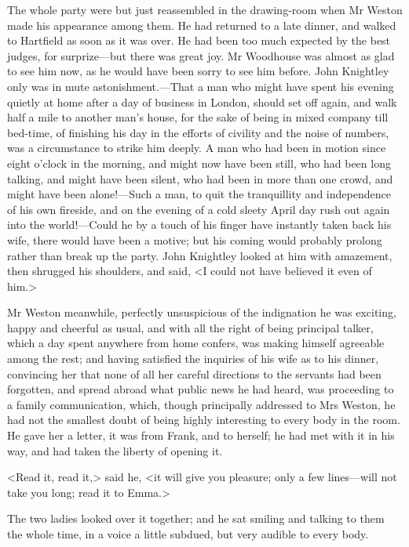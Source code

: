 The whole party were but just reassembled in the drawing-room when Mr Weston made his appearance among them. He had returned to a late dinner, and walked to Hartfield as soon as it was over. He had been too much expected by the best judges, for surprize—but there was great joy. Mr Woodhouse was almost as glad to see him now, as he would have been sorry to see him before. John Knightley only was in mute astonishment.—That a man who might have spent his evening quietly at home after a day of business in London, should set off again, and walk half a mile to another man's house, for the sake of being in mixed company till bed-time, of finishing his day in the efforts of civility and the noise of numbers, was a circumstance to strike him deeply. A man who had been in motion since eight o'clock in the morning, and might now have been still, who had been long talking, and might have been silent, who had been in more than one crowd, and might have been alone!—Such a man, to quit the tranquillity and independence of his own fireside, and on the evening of a cold sleety April day rush out again into the world!—Could he by a touch of his finger have instantly taken back his wife, there would have been a motive; but his coming would probably prolong rather than break up the party. John Knightley looked at him with amazement, then shrugged his shoulders, and said, <I could not have believed it even of him.>

Mr Weston meanwhile, perfectly unsuspicious of the indignation he was exciting, happy and cheerful as usual, and with all the right of being principal talker, which a day spent anywhere from home confers, was making himself agreeable among the rest; and having satisfied the inquiries of his wife as to his dinner, convincing her that none of all her careful directions to the servants had been forgotten, and spread abroad what public news he had heard, was proceeding to a family communication, which, though principally addressed to Mrs Weston, he had not the smallest doubt of being highly interesting to every body in the room. He gave her a letter, it was from Frank, and to herself; he had met with it in his way, and had taken the liberty of opening it.

<Read it, read it,> said he, <it will give you pleasure; only a few lines—will not take you long; read it to Emma.>

The two ladies looked over it together; and he sat smiling and talking to them the whole time, in a voice a little subdued, but very audible to every body.

